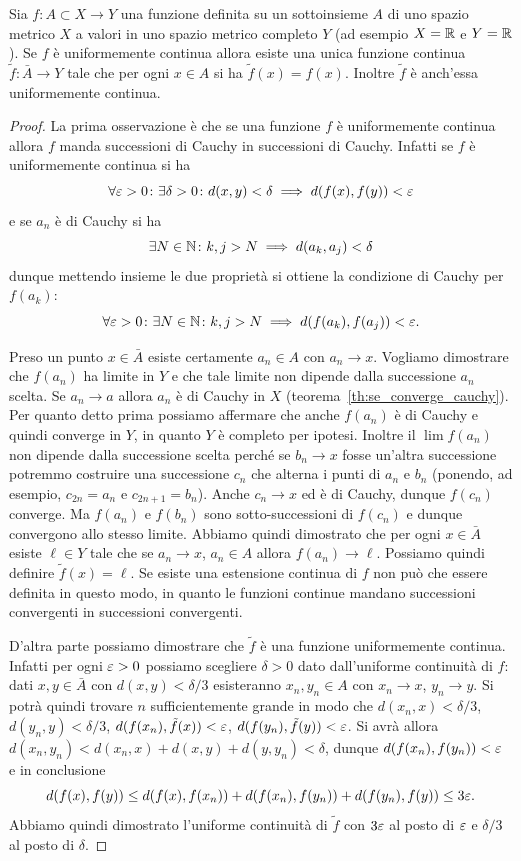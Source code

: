 \begin{theorem}
\mymark{**}%
\label{th:estensione_uniformemente_continua}%
Sia $f\colon A \subset X \to Y$ una funzione definita su un sottoinsieme $A$
di uno spazio metrico $X$ a valori in uno spazio metrico completo $Y$
(ad esempio $X={\mathbb R}$ e $Y={\mathbb R}$). Se $f$ è uniformemente continua allora
esiste una unica funzione continua $\tilde f \colon \bar A \to Y$
tale che per ogni $x\in A$ si ha $\tilde f(x) = f(x)$.
Inoltre $\tilde f$ è anch'essa uniformemente continua.
\end{theorem}
%
\begin{proof}
La prima osservazione è
che se una funzione $f$ è uniformemente continua allora $f$
manda successioni di Cauchy in successioni di Cauchy.
Infatti se $f$ è uniformemente continua si ha
\[
 \forall \varepsilon>0\colon \exists \delta>0 \colon d(x,y)<\delta \implies d(f(x),f(y))<\varepsilon
\]
e se $a_n$ è di Cauchy si ha
\[
 \exists N\in{\mathbb N} \colon k,j>N \implies d(a_k,a_j)< \delta
\]
dunque mettendo insieme le due proprietà
si ottiene la condizione
di Cauchy per $f(a_k)$:
\[
\forall \varepsilon>0\colon \exists N\in {\mathbb N}\colon k,j>N \implies d(f(a_k),f(a_j))< \varepsilon.
\]

Preso un punto $x \in \bar A$ esiste certamente $a_n \in A$ con $a_n\to x$.
Vogliamo dimostrare che $f(a_n)$ ha limite in $Y$ e che tale limite non
dipende dalla successione $a_n$ scelta. Se $a_n \to a$ allora $a_n$ è di Cauchy in $X$
(teorema~\ref{th:se_converge_cauchy}).
Per quanto detto prima possiamo affermare che anche $f(a_n)$ è di Cauchy
e quindi converge in $Y$, in quanto $Y$ è completo per ipotesi.
Inoltre il $\lim f(a_n)$ non dipende dalla successione scelta perché
se $b_n\to x$ fosse un'altra successione potremmo costruire una successione
$c_n$ che alterna i punti di $a_n$ e $b_n$ (ponendo, ad esempio, $c_{2n} = a_n$ e
$c_{2n+1} = b_n$). Anche $c_n \to x$ ed è di Cauchy, dunque $f(c_n)$ converge.
Ma $f(a_n)$ e $f(b_n)$ sono sotto-successioni di $f(c_n)$ e dunque convergono
allo stesso limite.
Abbiamo quindi dimostrato che per ogni $x\in \bar A$ esiste $\ell \in Y$
tale che se $a_n\to x$, $a_n\in A$ allora $f(a_n) \to \ell$. Possiamo
quindi definire $\tilde f(x)=\ell$. Se esiste una estensione continua di
$f$ non può che essere definita in questo modo, in quanto le funzioni continue
mandano successioni convergenti in successioni convergenti.

D'altra parte possiamo dimostrare che $\tilde f$ è una funzione uniformemente continua.
Infatti per ogni $\varepsilon>0$ possiamo scegliere $\delta>0$ dato dall'uniforme
continuità di $f$: dati $x,y\in \bar A$ con $d(x,y)<\delta/3$ esisteranno
$x_n,y_n \in A$ con $x_n\to x$, $y_n\to y$. Si potrà quindi trovare $n$
sufficientemente grande in modo che
$d(x_n,x)<\delta/3$, $d(y_n,y)<\delta/3$,
$d(f(x_n),\tilde f(x)) < \varepsilon$, $d(f(y_n),\tilde f(y)) < \varepsilon$.
Si avrà allora
$d(x_n,y_n)< d(x_n,x)+d(x,y)+d(y,y_n) < \delta$, dunque $d(f(x_n),f(y_n))<\varepsilon$
e in conclusione
\[
d(f(x),f(y))
\le d(f(x),f(x_n)) + d(f(x_n),f(y_n)) + d(f(y_n),f(y))
\le 3\varepsilon.
\]
Abbiamo quindi dimostrato l'uniforme continuità di $\tilde f$ con $3\varepsilon$ al posto
di $\varepsilon$ e $\delta/3$
al posto di $\delta$.
\end{proof}

